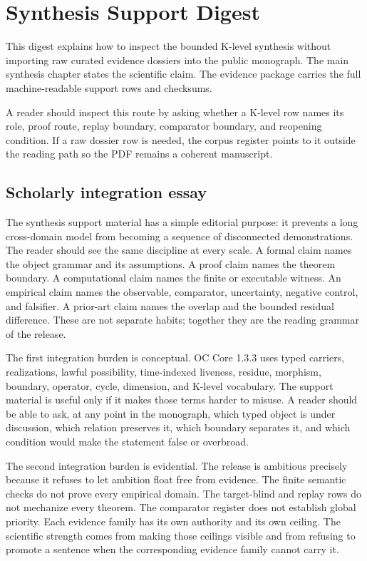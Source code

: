 \section{Synthesis Support Digest}

\label{sec:oc-core-1-3-synthesis-support-dossiers}

This digest explains how to inspect the bounded K-level synthesis without importing raw curated evidence dossiers into the public monograph. The main synthesis chapter states the scientific claim. The evidence package carries the full machine-readable support rows and checksums.


A reader should inspect this route by asking whether a K-level row names its role, proof route, replay boundary, comparator boundary, and reopening condition. If a raw dossier row is needed, the corpus register points to it outside the reading path so the PDF remains a coherent manuscript.


\subsection{Scholarly integration essay}

The synthesis support material has a simple editorial purpose: it prevents a long cross-domain model from becoming a sequence of disconnected demonstrations. The reader should see the same discipline at every scale. A formal claim names the object grammar and its assumptions. A proof claim names the theorem boundary. A computational claim names the finite or executable witness. An empirical claim names the observable, comparator, uncertainty, negative control, and falsifier. A prior-art claim names the overlap and the bounded residual difference. These are not separate habits; together they are the reading grammar of the release.


The first integration burden is conceptual. OC Core 1.3.3 uses typed carriers, realizations, lawful possibility, time-indexed liveness, residue, morphism, boundary, operator, cycle, dimension, and K-level vocabulary. The support material is useful only if it makes those terms harder to misuse. A reader should be able to ask, at any point in the monograph, which typed object is under discussion, which relation preserves it, which boundary separates it, and which condition would make the statement false or overbroad.


The second integration burden is evidential. The release is ambitious precisely because it refuses to let ambition float free from evidence. The finite semantic checks do not prove every empirical domain. The target-blind and replay rows do not mechanize every theorem. The comparator register does not establish global priority. Each evidence family has its own authority and its own ceiling. The scientific strength comes from making those ceilings visible and from refusing to promote a sentence when the corresponding evidence family cannot carry it.


